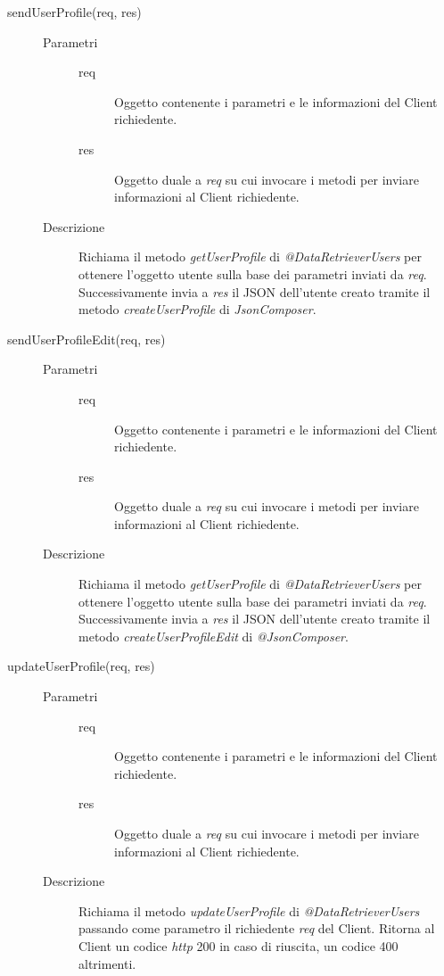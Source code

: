 \begin{description}
\begin{description}
    \item[sendUserProfile(req, res)] \hfill
      \begin{description}
	\item[Parametri] \hfill
	  \begin{description}
	    \item[req]
	    Oggetto contenente i parametri e le informazioni del Client richiedente.
	    \item[res]
	    Oggetto duale a \textit{req} su cui invocare i metodi per inviare informazioni al Client richiedente.
	  \end{description}
	\item[Descrizione]
	Richiama il metodo \textit{getUserProfile} di \textit{@DataRetrieverUsers} per ottenere l'oggetto utente 
	sulla base dei parametri inviati da \textit{req}. Successivamente invia a \textit{res} il JSON dell'utente 
	creato tramite il metodo \textit{createUserProfile} di \textit{JsonComposer}.
      \end{description}
      
    \item[sendUserProfileEdit(req, res)] \hfill
      \begin{description}
	\item[Parametri] \hfill
	  \begin{description}
	    \item[req]
	    Oggetto contenente i parametri e le informazioni del Client richiedente.
	    \item[res]
	    Oggetto duale a \textit{req} su cui invocare i metodi per inviare informazioni al Client richiedente.
	  \end{description}
	\item[Descrizione]
	Richiama il metodo \textit{getUserProfile} di \textit{@DataRetrieverUsers} per ottenere l'oggetto utente 
	sulla base dei parametri inviati da \textit{req}. Successivamente invia a \textit{res} il JSON dell'utente 
	creato tramite il metodo \textit{createUserProfileEdit} di \textit{@JsonComposer}.
      \end{description}
      
    \item[updateUserProfile(req, res)] \hfill
      \begin{description}
	\item[Parametri] \hfill
	  \begin{description}
	    \item[req]
	    Oggetto contenente i parametri e le informazioni del Client richiedente.
	    \item[res]
	    Oggetto duale a \textit{req} su cui invocare i metodi per inviare informazioni al Client richiedente.
	  \end{description}
	\item[Descrizione]
	Richiama il metodo \textit{updateUserProfile} di \textit{@DataRetrieverUsers} passando come parametro 
	il richiedente \textit{req} del Client. Ritorna al Client un codice \textit{http} 200 in caso di riuscita, 
	un codice 400 altrimenti.
      \end{description}
      

\end{description}
\end{description}
